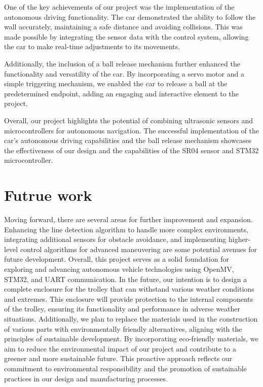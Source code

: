 \documentclass[12pt, a4paper, oneside]{report}
\begin{document}
One of the key achievements of our project was the implementation of the autonomous driving functionality. The car demonstrated the ability to follow the wall accurately, maintaining a safe distance and avoiding collisions. This was made possible by integrating the sensor data with the control system, allowing the car to make real-time adjustments to its movements.

Additionally, the inclusion of a ball release mechanism further enhanced the functionality and versatility of the car. By incorporating a servo motor and a simple triggering mechanism, we enabled the car to release a ball at the predetermined endpoint, adding an engaging and interactive element to the project.

Overall, our project highlights the potential of combining ultrasonic sensors and microcontrollers for autonomous navigation. The successful implementation of the car's autonomous driving capabilities and the ball release mechanism showcases the effectiveness of our design and the capabilities of the SR04 sensor and STM32 microcontroller.

\section{Futrue work}
Moving forward, there are several areas for further improvement and expansion. Enhancing the line detection algorithm to handle more complex environments, integrating additional sensors for obstacle avoidance, and implementing higher-level control algorithms for advanced maneuvering are some potential avenues for future development. Overall, this project serves as a solid foundation for exploring and advancing autonomous vehicle technologies using OpenMV, STM32, and UART communication. In the future, our intention is to design a complete enclosure for the trolley that can withstand various weather conditions and extremes. This enclosure will provide protection to the internal components of the trolley, ensuring its functionality and performance in adverse weather situations. Additionally, we plan to replace the materials used in the construction of various parts with environmentally friendly alternatives, aligning with the principles of sustainable development. By incorporating eco-friendly materials, we aim to reduce the environmental impact of our project and contribute to a greener and more sustainable future. This proactive approach reflects our commitment to environmental responsibility and the promotion of sustainable practices in our design and manufacturing processes.
\end{document}
